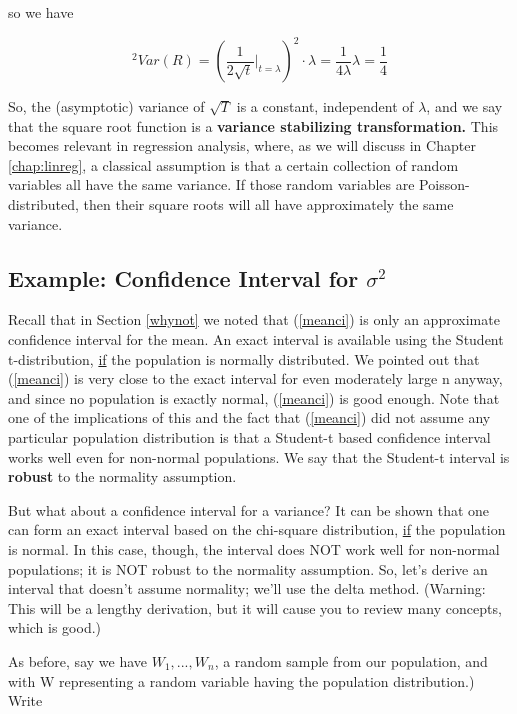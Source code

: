 so we have

\begin{equation}
[h'(\eta)]^2 Var(R) =
\left ( \frac{1}{2\sqrt{t}} \Big |_{t=\lambda} \right )^2 \cdot \lambda =
\frac{1}{4 \lambda} \lambda = \frac{1}{4}
\end{equation}

So, the (asymptotic) variance of $\sqrt{T}$ is a constant, independent
of $\lambda$, and we say that the square root function is a {\bf
variance stabilizing transformation.} This becomes relevant in
regression analysis, where, as we will discuss in Chapter
\ref{chap:linreg}, a
classical assumption is that a certain collection of random variables
all have the same variance.  If those random variables are
Poisson-distributed, then their square roots will all have approximately
the same variance.

\subsection{Example:  Confidence Interval for $\sigma^2$}
\label{cisigma2}

Recall that in Section \ref{whynot} we noted that (\ref{meanci}) is only
an approximate confidence interval for the mean.  An exact interval is
available using the Student t-distribution, \underline{if} the
population is normally distributed.  We pointed out that (\ref{meanci})
is very close to the exact interval for even moderately large n anyway,
and since no population is exactly normal, (\ref{meanci}) is good
enough.  Note that one of the implications of this and the fact that
(\ref{meanci}) did not assume any particular population distribution 
is that a Student-t based confidence interval works well even for
non-normal populations.  We say that the Student-t interval is {\bf
robust} to the normality assumption.

But what about a confidence interval for a variance?  It can be shown
that one can form an exact interval based on the chi-square
distribution, \underline{if} the population is normal.  In this case,
though, the interval does NOT work well for non-normal populations; it
is NOT robust to the normality assumption.  So, let's derive an interval
that doesn't assume normality; we'll use the delta method.  (Warning:
This will be a lengthy derivation, but it will cause you to review 
many concepts, which is good.)

As before, say we have $W_1,...,W_n$, a random sample from our
population, and with W representing a random variable having the
population distribution.) Write

